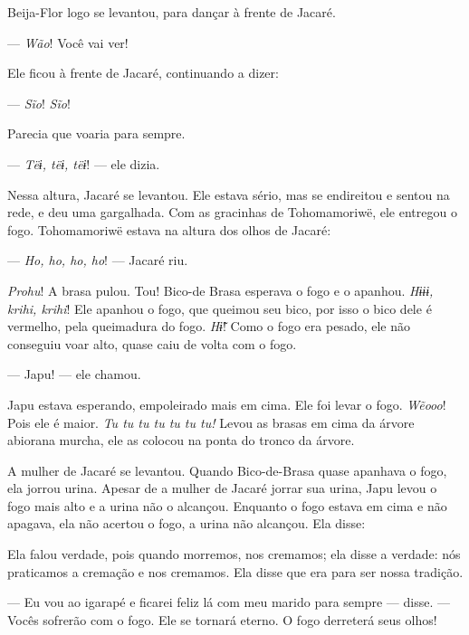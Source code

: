 Beija-Flor logo se levantou, para dançar à frente de Jacaré.

--- \textit{Wão}! Você vai ver!

Ele ficou à frente de Jacaré, continuando a dizer:

--- \textit{Sĩo}! \textit{Sĩo}!

Parecia que voaria para sempre. 

--- \textit{Tëɨ, tëɨ, tëɨ}! --- ele dizia. 



Nessa altura, Jacaré se levantou. Ele estava sério, mas se endireitou e
sentou na rede, e deu uma gargalhada. Com as gracinhas de Tohomamoriwë,
ele entregou o fogo. Tohomamoriwë estava na altura dos olhos de Jacaré: 

--- \textit{Ho, ho, ho, ho}! --- Jacaré riu. 

\textit{Prohu}! A brasa pulou. Tou! Bico-de Brasa esperava o fogo e
o apanhou. \textit{Hɨɨɨ, krihi, krihi}! Ele apanhou o fogo, que queimou seu
bico, por isso o bico dele é vermelho, pela queimadura do
fogo. \textit{Hɨ̃}! Como o fogo era pesado, ele não conseguiu voar alto,
quase caiu de volta com o fogo. 

--- Japu! --- ele chamou.

Japu estava esperando, empoleirado mais em cima. Ele foi levar o fogo.
\textit{Wẽooo}! Pois ele é maior. \textit{Tu tu tu tu tu tu tu!} Levou as brasas em cima
da árvore abiorana murcha, ele as colocou na ponta do tronco da árvore. 

A mulher de Jacaré se levantou. Quando Bico-de-Brasa quase apanhava o
fogo, ela jorrou urina. Apesar de a mulher de Jacaré jorrar sua urina,
Japu levou o fogo mais alto e a urina não o alcançou. Enquanto
o fogo estava em cima e não apagava, ela não acertou o fogo, a urina não
alcançou. Ela disse:


Ela falou verdade, pois quando morremos, nos cremamos; ela disse a
verdade: nós praticamos a cremação e nos cremamos. Ela disse que era
para ser nossa tradição. 

--- Eu vou ao igarapé e ficarei feliz lá com meu marido para sempre ---
disse. --- Vocês sofrerão com o fogo. Ele se tornará eterno. O fogo
derreterá seus olhos! 

